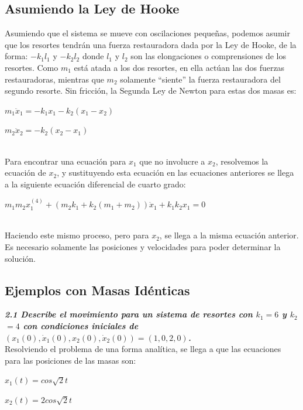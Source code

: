 \documentclass[12pt]{article}
\begin{document}
\subsection*{Asumiendo la Ley de Hooke}
Asumiendo que el sistema se mueve con oscilaciones pequeñas, podemos asumir que los resortes tendrán una fuerza restauradora dada por la Ley de Hooke, de la forma: $-k_1$$l_1$ y $-k_2$$l_2$ donde $l_1$ y $l_2$ son las elongaciones o comprensiones de los resortes. Como $m_1$ está atada a los dos resortes, en ella actúan las dos fuerzas restauradoras, mientras que $m_2$ solamente “siente” la fuerza restauradora del segundo resorte. Sin fricción, la Segunda Ley de Newton para estas dos masas es:\\
\centerline{$m_1 \ddot x_1 = -k_1x_1 - k_2(x_1-x_2)$}
\centerline{$m_2 \ddot x_2 = -k_2(x_2-x_1)$}\\

Para encontrar una ecuación para $x_1$ que no involucre a $x_2$, resolvemos la ecuación de $x_2$, y sustituyendo esta ecuación en las ecuaciones anteriores se llega a la siguiente ecuación diferencial de cuarto grado:\\
\centerline{$m_1m_2x_1^{(4)} + (m_2k_1 + k_2(m_1+m_2)) \ddot x_1 + k_1k_2x_1=0$}\\

Haciendo este mismo proceso, pero para $x_2$, se llega a la misma ecuación anterior. Es necesario solamente las posiciones y velocidades para poder determinar la solución.

\subsection*{Ejemplos con Masas Idénticas}
\textbf{\textit{2.1 Describe el movimiento para un sistema de resortes con $k_1$$=6$ y $k_2$$=4$ con condiciones iniciales de $(x_1(0), \dot x_1(0), x_2(0), \dot x_2(0))=(1,0,2,0)$.}}\\

Resolviendo el problema de una forma analítica, se llega a que las ecuaciones para las posiciones de las masas son:\\
\centerline{$x_1(t)=cos\sqrt2t$}
\centerline{$x_2(t)=2cos\sqrt2t$}\\
\end{document}
